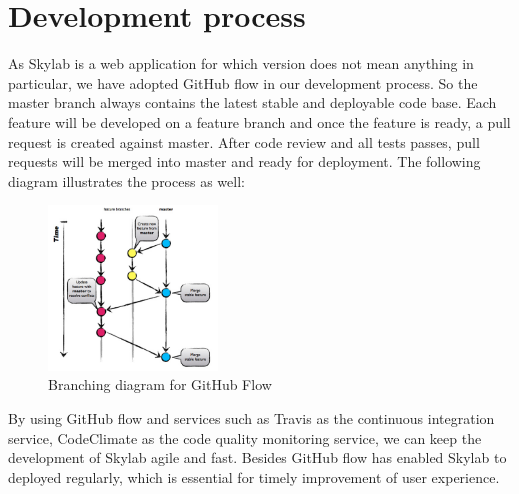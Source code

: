 \section{Development process}

As Skylab is a web application for which version does not mean anything in particular, we have adopted GitHub flow in our development process\cite{citation8}. So the master branch always contains the latest stable and deployable code base. Each feature will be developed on a feature branch and once the feature is ready, a pull request is created against master. After code review and all tests passes, pull requests will be merged into master and ready for deployment. The following diagram illustrates the process as well:

\begin{figure}[h]
    \centering
    \includegraphics[width=0.4\textwidth]{Images/Github_Flow_Branching_Model.jpg}
    \caption{Branching diagram for GitHub Flow}
\end{figure}

By using GitHub flow and services such as Travis as the continuous integration service, CodeClimate as the code quality monitoring service, we can keep the development of Skylab agile and fast. Besides GitHub flow has enabled Skylab to deployed regularly, which is essential for timely improvement of user experience\cite{citation9}.
